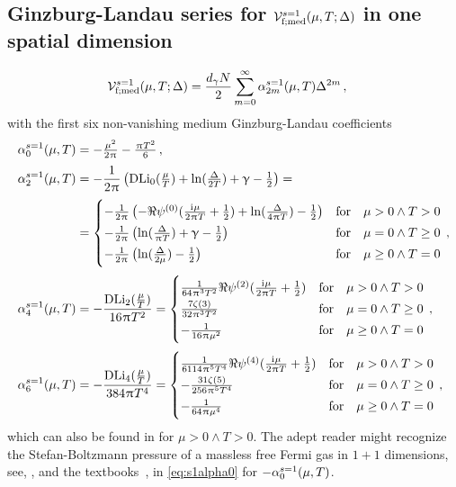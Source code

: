 \subsection{Ginzburg-Landau series \texorpdfstring{for $\mathcal{V}_{\mathrm{f};\med}^{s=1}(\muT;\Delta)$}{} in one spatial dimension}\label{app:Vmedf1Series}
\begin{align}
	\VeffArgs[\mathrm{f};\med][s=1]{\muT;\Delta} &= \frac{d_\gamma N}{2}\sum_{m=0}^\infty \alpha_{2m}^{s=1}(\muT)\Delta^{2m}\, ,
\end{align}
with the first six non-vanishing medium Ginzburg-Landau coefficients
\begin{align}
	\alpha_0^{s=1}(\muT) &= -\tfrac{\mu^2}{2 \piu }-\tfrac{\piu  T^2}{6}\, ,\label{eq:s1alpha0} \\[.25em]
	\alpha_2^{s=1}(\muT) &= -\frac{1}{2\piu}\del[1]{\DLi_0(\tfrac{\mu}{T}) + \ln (\tfrac{\Delta }{2 T}) + \emc -\tfrac{1}{2} } = \notag\\[.25em]
	&=\begin{cases}
		-\frac{1}{2 \piu }\del[1]{-\Re\MFpsi^{(0)}(\tfrac{\iu \mu }{2 \piu  T}+\tfrac{1}{2})+\ln (\tfrac{\Delta }{4 \piu  T})-\tfrac{1}{2}} &\text{for}\quad \mu>0\land T>0 \\[.25em]
		-\frac{1}{2 \piu }\del[1]{\ln (\tfrac{\Delta }{\piu  T})+\emc -\tfrac{1}{2}} &\text{for}\quad \mu=0\land T\geq 0\\[.25em]
		-\frac{1}{2 \piu }\del[1]{\ln (\tfrac{\Delta }{2 \mu })-\tfrac{1}{2}} &\text{for}\quad  \mu\geq 0\land T=0
	\end{cases}\, ,\label{eq:s1alpha2}\\[.25em]
	\alpha_4^{s=1}(\muT) &=  -\frac{\DLi_2(\tfrac{\mu}{T})}{16\piu T^2} = \begin{cases}
		\frac{1}{64 \piu ^3 T^2}\Re\MFpsi^{(2)}(\tfrac{\iu \mu }{2 \piu  T}+\tfrac{1}{2}) &\text{for}\quad \mu>0\land T>0 \\[.25em]
		\frac{7 \zeta (3)}{32 \piu ^3 T^2} &\text{for}\quad \mu=0\land T\geq 0 \\[.25em]
		-\frac{1}{16 \piu  \mu ^2} &\text{for}\quad  \mu\geq 0\land T=0
	\end{cases}\, \label{eq:s1alpha4} ,\\[.25em]
	\alpha_6^{s=1}(\muT) &= -\frac{\DLi_4(\tfrac{\mu}{T})}{384\piu T^4} = \begin{cases}
		\frac{1}{6114 \piu ^5 T^4}\Re\MFpsi^{(4)}(\tfrac{\iu \mu }{2 \piu  T}+\tfrac{1}{2}) &\text{for}\quad \mu>0\land T>0 \\[.25em]
		-\frac{31 \zeta (5)}{256 \piu ^5 T^4} &\text{for}\quad \mu=0\land T\geq 0 \\[.25em]
		-\frac{1}{64 \piu  \mu ^4} &\text{for}\quad \mu \geq 0\land T=0
	\end{cases}\, ,\label{eq:s1alpha6} 
\end{align}
which can also be found in  for $\mu>0\land T>0$.
The adept reader might recognize the Stefan-Boltzmann pressure of a massless free Fermi gas in $1 + 1$ dimensions, see, \eg{},  and the textbooks~\cite{Kleinert:2016,Kapusta:2006pm}, in \cref{eq:s1alpha0} for $- \alpha_0^{s=1}(\muT)$.

